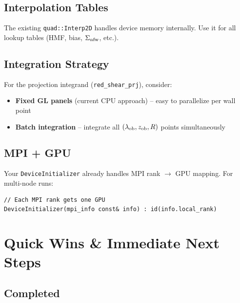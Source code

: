 \documentclass[a4paper, 11pt]{article}
\begin{document}
\subsection{Interpolation Tables}

The existing \texttt{quad::Interp2D} handles device memory internally. Use it for all lookup tables (HMF, bias, $\Sigma_{\rm nfw}$, etc.).

\subsection{Integration Strategy}

For the projection integrand (\texttt{red\_shear\_prj}), consider:
\begin{itemize}
  \setlength\itemsep{2pt}
  \item \textbf{Fixed GL panels} (current CPU approach) -- easy to parallelize per wall point
  \item \textbf{Batch integration} -- integrate all $(\lambda_{\rm ob}, z_{\rm ob}, R)$ points simultaneously
\end{itemize}

\subsection{MPI + GPU}

Your \texttt{DeviceInitializer} already handles MPI rank $\to$ GPU mapping. For multi-node runs:

\begin{lstlisting}
// Each MPI rank gets one GPU
DeviceInitializer(mpi_info const& info) : id(info.local_rank)
\end{lstlisting}

\section{Quick Wins \& Immediate Next Steps}
\label{sec:quickwins}

\subsection{Completed}
\end{document}
